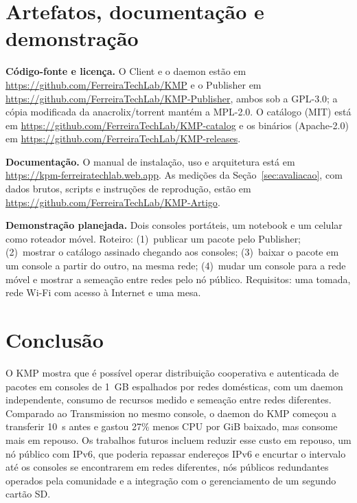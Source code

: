 \documentclass[12pt]{article}
\newcommand{\kmp}{\textsc{KMP}}
\begin{document}
\section{Artefatos, documentação e demonstração}
\label{sec:artefatos}

\textbf{Código-fonte e licença.} O Client e o daemon estão em
\url{https://github.com/FerreiraTechLab/KMP} e o Publisher em
\url{https://github.com/FerreiraTechLab/KMP-Publisher}, ambos sob a
GPL-3.0; a cópia modificada da anacrolix/torrent mantém a MPL-2.0. O
catálogo (MIT) está em \url{https://github.com/FerreiraTechLab/KMP-catalog}
e os binários (Apache-2.0) em
\url{https://github.com/FerreiraTechLab/KMP-releases}.

\textbf{Documentação.} O manual de instalação, uso e arquitetura está em
\url{https://kpm-ferreiratechlab.web.app}. As medições da
Seção~\ref{sec:avaliacao}, com dados brutos, scripts e instruções de
reprodução, estão em \url{https://github.com/FerreiraTechLab/KMP-Artigo}.

\textbf{Demonstração planejada.} Dois consoles portáteis, um notebook e um
celular como roteador móvel. Roteiro: (1)~publicar um pacote pelo Publisher;
(2)~mostrar o catálogo assinado chegando aos consoles; (3)~baixar o pacote em
um console a partir do outro, na mesma rede; (4)~mudar um console para a
rede móvel e mostrar a semeação entre redes pelo nó público. Requisitos:
uma tomada, rede Wi-Fi com acesso à Internet e uma mesa.

\section{Conclusão}
\label{sec:conclusao}

O \kmp{} mostra que é possível operar distribuição cooperativa e autenticada
de pacotes em consoles de 1~GB espalhados por redes domésticas, com um
daemon independente, consumo de recursos medido e semeação entre redes
diferentes. Comparado ao Transmission no mesmo console, o daemon do \kmp{}
começou a transferir 10~s antes e gastou 27\% menos CPU por GiB baixado, mas
consome mais em repouso. Os trabalhos futuros incluem reduzir esse custo em
repouso, um nó público com IPv6, que poderia repassar endereços IPv6 e encurtar
o intervalo até os consoles se encontrarem em redes diferentes, nós públicos
redundantes operados pela comunidade e a integração com o gerenciamento de um
segundo cartão SD.



\end{document}
